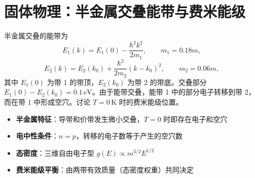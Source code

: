 \section{固体物理：半金属交叠能带与费米能级}
\label{sec:semimetal-overlap}

\begin{modelbox}[题目：半金属能带交叠时的费米能级位置]
半金属交叠的能带为
\[
E_1(k)=E_1(0)-\frac{\hbar^2k^2}{2m_1},\qquad m_1=0.18m,
\]
\[
E_2(k)=E_2(k_0)+\frac{\hbar^2}{2m_2}(k-k_0)^2,\qquad m_2=0.06m,
\]
其中 $E_1(0)$ 为带 1 的带顶，$E_2(k_0)$ 为带 2 的带底。交叠部分 $E_1(0)-E_2(k_0)=0.1\,\text{eV}$。由于能带交叠，能带 1 中的部分电子转移到带 2，而在带 1 中形成空穴。讨论 $T=0\,\text{K}$ 时的费米能级位置。
\end{modelbox}

\begin{tipbox}[考点快速分析]
\begin{itemize}
    \item \textbf{半金属特征}：导带和价带发生微小交叠，$T=0$ 时即存在电子和空穴
    \item \textbf{电中性条件}：$n=p$，转移的电子数等于产生的空穴数
    \item \textbf{态密度}：三维自由电子型 $g(E)\propto m^{3/2}E^{1/2}$
    \item \textbf{费米能级平衡}：由两带有效质量（态密度权重）共同决定
\end{itemize}
\end{tipbox}

